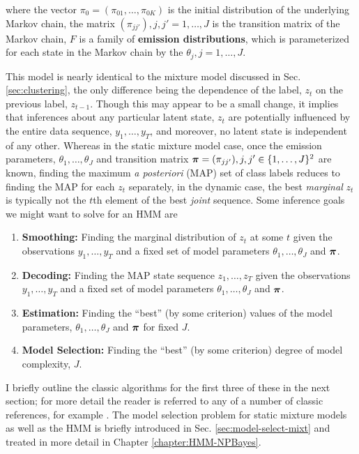 where the vector $\pi_0 = (\pi_{01}, \dots, \pi_{0K})$ is the initial
distribution of the underlying Markov chain, the matrix $(\pi_{jj'}),
j,j' = 1, \dots, J$ is the transition matrix of the Markov chain, $F$
is a family of {\bf emission distributions}, which is parameterized
for each state in the Markov chain by the $\theta_j, j = 1, \dots, J$.

This model is nearly identical to the mixture model discussed in
Sec. \ref{sec:clustering}, the only difference being the dependence of
the label, $z_t$ on the previous label, $z_{t-1}$.  Though this
may appear to be a small change, it implies that inferences about any
particular latent state, $z_t$ are potentially influenced by the entire
data sequence, $y_1, \dots, y_T$, and moreover, no latent state is
independent of any other.  Whereas in the static mixture model case,
once the emission parameters, $\theta_1, \dots, \theta_J$ and
transition matrix $\boldsymbol{\pi} = (\pi_{jj'}), j,j' \in \{1,\dots,J\}^2$ are known, finding the maximum 
{\em a posteriori} (MAP) set of class labels reduces to finding
the MAP for each $z_t$ separately, in the dynamic case, the best {\em
marginal} $z_t$ is typically not the $t$th element of the best {\em
joint} sequence.  Some inference goals we might want to solve for an
HMM are
\begin{enumerate}
\item {\bf Smoothing:} \label{goal:smoothing} Finding the marginal distribution of $z_t$ at
  some $t$ given the observations $y_1, \dots, y_T$ and a fixed set of model
  parameters $\theta_1, \dots, \theta_J$ and $\boldsymbol{\pi}$.
\item {\bf Decoding:} \label{goal:decoding} Finding the MAP state sequence $z_1, \dots, z_T$
  given the observations $y_1, \dots, y_T$ and a fixed set of model
  parameters $\theta_1, \dots, \theta_J$ and $\boldsymbol{\pi}$.
\item {\bf Estimation:} \label{goal:estimation} Finding the ``best'' (by some criterion)
  values of the model parameters, $\theta_1, \dots, \theta_J$ and
  $\boldsymbol{\pi}$ for fixed $J$.
\item {\bf Model Selection:} \label{goal:model-selection}
  Finding the ``best'' (by some criterion)
  degree of model complexity, $J$.
\end{enumerate}

I briefly outline the classic algorithms for the first three of these
in the next section; for more detail the reader is referred to any of
a number of classic references, for example
\citet{rabiner1986introduction, rabiner1989tutorial,
  bishop2006pattern}.  The model selection problem for static mixture
models as well as the HMM is briefly introduced in
Sec. \ref{sec:model-select-mixt} and treated in more detail in Chapter \ref{chapter:HMM-NPBayes}.

